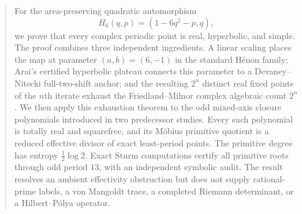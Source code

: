 \begin{abstract}
For the area-preserving quadratic automorphism
\[
H_6(q,p)=(1-6q^2-p,q),
\]
we prove that every complex periodic point is real, hyperbolic, and simple.
The proof combines three independent ingredients.  A linear scaling places
the map at parameter $(a,b)=(6,-1)$ in the standard H\'enon family; Arai's
certified hyperbolic plateau connects this parameter to a
Devaney--Nitecki full-two-shift anchor; and the resulting $2^n$ distinct real
fixed points of the $n$th iterate exhaust the Friedland--Milnor complex
algebraic count $2^n$.  We then apply this exhaustion theorem to the odd
mixed-axis closure polynomials introduced in two predecessor studies.  Every
such polynomial is totally real and squarefree, and its M\"obius primitive
quotient is a reduced effective divisor of exact least-period points.  The
primitive degree has entropy $\tfrac12\log2$.  Exact Sturm computations
certify all primitive roots through odd period $13$, with an independent
symbolic audit.  The result resolves an ambient effectivity obstruction but
does not supply rational-prime labels, a von Mangoldt trace, a completed
Riemann determinant, or a Hilbert--P\'olya operator.
\end{abstract}
